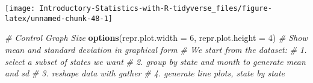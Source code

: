 \documentclass[
]{book}
\newenvironment{Shaded}{\begin{snugshade}}{\end{snugshade}}
\newcommand{\CommentTok}[1]{\textcolor[rgb]{0.56,0.35,0.01}{\textit{#1}}}
\newcommand{\DataTypeTok}[1]{\textcolor[rgb]{0.13,0.29,0.53}{#1}}
\newcommand{\DecValTok}[1]{\textcolor[rgb]{0.00,0.00,0.81}{#1}}
\newcommand{\KeywordTok}[1]{\textcolor[rgb]{0.13,0.29,0.53}{\textbf{#1}}}
\newcommand{\NormalTok}[1]{#1}
\begin{document}
\begin{center}\texttt{[image: Introductory-Statistics-with-R-tidyverse\_files/figure-latex/unnamed-chunk-48-1]} \end{center}

\begin{Shaded}
\begin{Highlighting}[]
\CommentTok{\# Control Graph Size}
\KeywordTok{options}\NormalTok{(}\DataTypeTok{repr.plot.width =} \DecValTok{6}\NormalTok{, }\DataTypeTok{repr.plot.height =} \DecValTok{4}\NormalTok{)}
\CommentTok{\# Show mean and standard deviation in graphical form}
\CommentTok{\# We start from the dataset:}
\CommentTok{\# 1. select a subset of states we want}
\CommentTok{\# 2. group by state and month to generate mean and sd}
\CommentTok{\# 3. reshape data with gather}
\CommentTok{\# 4. generate line plots, state by state}


\end{Highlighting}
\end{Shaded}
\end{document}
